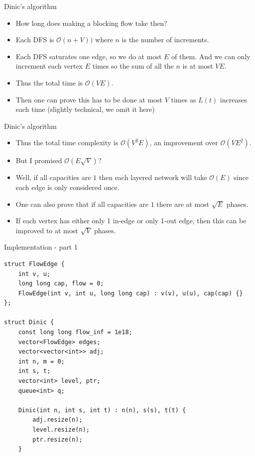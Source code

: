 \documentclass{beamer}
\begin{document}
	\begin{frame}[plain]{Dinic's algorithm}
		\begin{itemize}
			\item How long does making a blocking flow take then?
			\item Each DFS is $\mathcal{O}(n + V))$ where $n$ is the number of increments. 
			\item Each DFS saturates one edge, so we do at most $E$ of them. And we can only increment each vertex $E$ times so the sum of all the $n$ is at most $VE$.
			\item Thus the total time is $\mathcal{O}(VE)$.
			\item Then one can prove this has to be done at most $V$ times as $L(t)$ increases each time (slightly technical, we omit it here)
		\end{itemize}
	\end{frame}
	
	\begin{frame}[plain]{Dinic's algorithm}
		\begin{itemize}
			\item Thus the total time complexity is $\mathcal{O}(V^2E)$, an improvement over $\mathcal{O}(VE^2)$.
			\item But I promised $\mathcal{O}(E\sqrt{V})$?
			\item Well, if all capacities are $1$ then each layered network will take $\mathcal{O}(E)$ since each edge is only considered once.
			\item One can also prove that if all capacities are $1$ there are at most $\sqrt{E}$ phases.
			\item If each vertex has either only 1 in-edge or only 1-out edge, then this can be improved to at most $\sqrt{V}$ phases.
		\end{itemize}
	\end{frame}
	
	\begin{frame}{Implementation - part 1}
		\begin{scriptsize}
		\begin{verbatim}
struct FlowEdge {
	int v, u;
	long long cap, flow = 0;
	FlowEdge(int v, int u, long long cap) : v(v), u(u), cap(cap) {}
};

struct Dinic {
	const long long flow_inf = 1e18;
	vector<FlowEdge> edges;
	vector<vector<int>> adj;
	int n, m = 0;
	int s, t;
	vector<int> level, ptr;
	queue<int> q;
	
	Dinic(int n, int s, int t) : n(n), s(s), t(t) {
		adj.resize(n);
		level.resize(n);
		ptr.resize(n);
	}
		\end{verbatim}
		\end{scriptsize}
	\end{frame}
	
\end{document}
